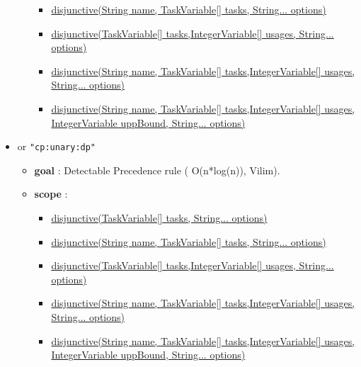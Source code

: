 \begin{itemize}
\begin{itemize}
\begin{itemize}
						\item \hyperlink{disjunctive:disjunctiveconstraint}{disjunctive(String name, TaskVariable[] tasks, String... options)}													\item \hyperlink{disjunctive:disjunctiveconstraint}{disjunctive(TaskVariable[] tasks,IntegerVariable[] usages, String... options)}
						\item \hyperlink{disjunctive:disjunctiveconstraint}{disjunctive(String name, TaskVariable[] tasks,IntegerVariable[] usages, String... options)}							
						\item \hyperlink{disjunctive:disjunctiveconstraint}{disjunctive(String name, TaskVariable[] tasks,IntegerVariable[] usages, IntegerVariable uppBound, String... options)}
					\end{itemize}
		\end{itemize}
		
		\item \label{cdisjunctivedp:cdisjunctivedpoptions}\hypertarget{cdisjunctivedp:cdisjunctivedpoptions}{}		
		 or \texttt{"cp:unary:dp"}
		\begin{itemize}
				\item \textbf{goal} : Detectable Precedence rule ( O(n*log(n)), Vilim).
				\item \textbf{scope} : 
					\begin{itemize}
						\item \hyperlink{disjunctive:disjunctiveconstraint}{disjunctive(TaskVariable[] tasks, String... options) }
						\item \hyperlink{disjunctive:disjunctiveconstraint}{disjunctive(String name, TaskVariable[] tasks, String... options)}													\item \hyperlink{disjunctive:disjunctiveconstraint}{disjunctive(TaskVariable[] tasks,IntegerVariable[] usages, String... options)}
						\item \hyperlink{disjunctive:disjunctiveconstraint}{disjunctive(String name, TaskVariable[] tasks,IntegerVariable[] usages, String... options)}							
						\item \hyperlink{disjunctive:disjunctiveconstraint}{disjunctive(String name, TaskVariable[] tasks,IntegerVariable[] usages, IntegerVariable uppBound, String... options)}
					\end{itemize}
		\end{itemize}
		

\end{itemize}
